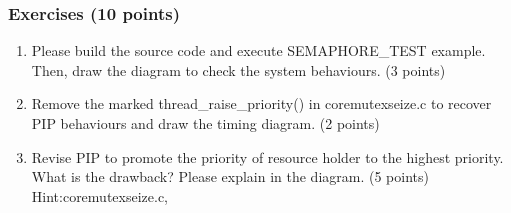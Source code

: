 \documentclass[t]{beamer}
\begin{document}
\begin{frame}
\frametitle{Exercises (10 points)}
\begin{enumerate}
\item Please build the source code and execute SEMAPHORE\_TEST example. Then, draw the diagram to check the system behaviours. (3 points)
\item Remove the marked thread\_raise\_priority() in coremutexseize.c to recover PIP behaviours and draw the timing diagram. (2 points)
\item Revise PIP to promote the priority of resource holder to the highest priority. What is the drawback? Please explain in the diagram. (5 points)
\newline Hint:coremutexseize.c, 
\end{enumerate}
\end{frame}
\end{document}
